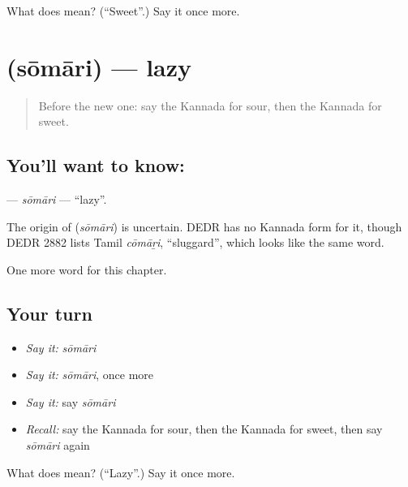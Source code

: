 \begin{tcolorbox}[breakable,colback=teal!4,colframe=teal!35!black,title={Before you move on}]
What does  mean? (\textquotedblleft{}Sweet\textquotedblright{}.) Say it once more.
\end{tcolorbox}
\section[\texorpdfstring{\kn{ಸೋಮಾರಿ} (sōmāri)}{ಸೋಮಾರಿ (sōmāri)}]{ (sōmāri) — lazy}

\label{lesson:KA-C145-somari}



\begin{quote}
Before the new one: say the Kannada for sour, then the Kannada for sweet.
\end{quote}

\subsection*{You'll want to know: }
\textbf{} — \emph{sōmāri} — \textquotedblleft{}lazy\textquotedblright{}.

\begin{cousinweb}
The origin of \textbf{} (\emph{sōmāri}) is uncertain. DEDR has no Kannada form for it, though DEDR 2882 lists Tamil \emph{cōmāṟi}, \textquotedblleft{}sluggard\textquotedblright{}, which looks like the same word.
\end{cousinweb}

\begin{grammarlens}[title={What you've built}]
One more word for this chapter.
\end{grammarlens}

\subsection*{Your turn}
\begin{itemize}
\raggedright
  \item \emph{Say it:} \emph{sōmāri}
  \item \emph{Say it:} \emph{sōmāri}, once more
  \item \emph{Say it:} say \emph{sōmāri}
  \item \emph{Recall:} say the Kannada for sour, then the Kannada for sweet, then say \emph{sōmāri} again
\end{itemize}

\begin{tcolorbox}[breakable,colback=teal!4,colframe=teal!35!black,title={Before you move on}]
What does  mean? (\textquotedblleft{}Lazy\textquotedblright{}.) Say it once more.
\end{tcolorbox}
